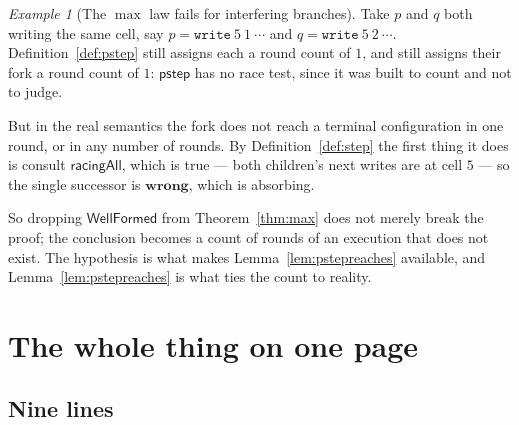 \documentclass[11pt,a4paper]{article}
\theoremstyle{definition}
\theoremstyle{plain}
\theoremstyle{remark}
\newtheorem{example}[definition]{Example}
\newcommand{\wf}{\mathsf{WellFormed}}
\newcommand{\pstep}{\mathsf{pstep}}
\newcommand{\wrong}{\mathbf{wrong}}
\begin{document}
\begin{example}[The $\max$ law fails for interfering branches]\label{ex:racycost}
Take $p$ and $q$ both writing the same cell, say $p = \texttt{write}\ 5\ 1\ \cdots$ and
$q = \texttt{write}\ 5\ 2\ \cdots$. Definition~\ref{def:pstep} still assigns each a round count
of $1$, and still assigns their fork a round count of $1$: $\pstep$ has no race test, since it
was built to count and not to judge.

But in the real semantics the fork does not reach a terminal configuration in one round, or in
any number of rounds. By Definition~\ref{def:step} the first thing it does is consult
$\mathsf{racingAll}$, which is true --- both children's next writes are at cell $5$ --- so the
single successor is $\wrong$, which is absorbing.

So dropping $\wf$ from Theorem~\ref{thm:max} does not merely break the proof; the conclusion
becomes a count of rounds of an execution that does not exist. The hypothesis is what makes
Lemma~\ref{lem:pstepreaches} available, and Lemma~\ref{lem:pstepreaches} is what ties the
count to reality.
\end{example}

\section{The whole thing on one page}\label{sec:recap}

\subsection{Nine lines}\label{sec:recap:nine}
\end{document}
